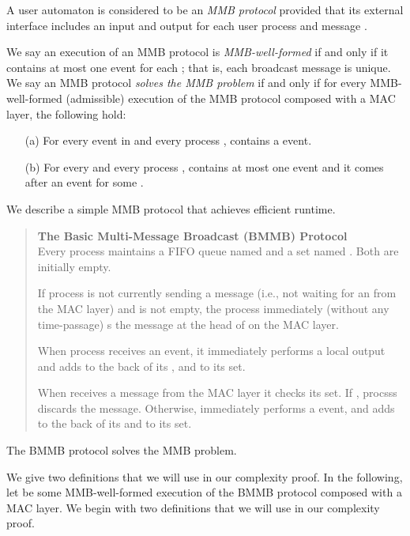A user automaton is considered to be an {\em MMB protocol} provided
that its external interface includes an  input
and  output for each user process 
and message .

We say an execution of an MMB protocol is {\em MMB-well-formed} if and only if it
contains at most one 
event for each ;
that is, each broadcast message is unique.
We say an MMB protocol {\em solves the MMB problem}
if and only if for every MMB-well-formed (admissible) execution 
of the MMB protocol composed with a MAC layer,
the following hold:
\begin{enumerate}
\item[(a)]
For every  event in  and every process ,
 contains a  event.
\item[(b)]
For every  and every process ,
 contains at most one  event and it
comes after an  event for some .
\end{enumerate}




We describe a simple MMB protocol that achieves efficient runtime.

\begin{quote}\small
{\bf The Basic Multi-Message Broadcast (BMMB) Protocol }\\
Every process  maintains a FIFO queue named  and a set
named .
Both are initially empty.

If process  is not currently sending a message (i.e., not waiting
for an  from the MAC layer) and  is not empty, the
process immediately (without any time-passage) s the message at
the head of  on the MAC layer.

When process  receives an  event, it immediately
performs a local  output and adds  to the back of its
, and to its  set.

When  receives a  message  from the MAC layer it checks
its  set.
If , procsss  discards the message.
Otherwise,  immediately performs a  event,
and adds  to the back of its  and to its  set.
\end{quote}


\begin{theorem}
The BMMB protocol solves the MMB problem.
\label{thm:bmmb}
\end{theorem}

We give two definitions that we will use in our complexity proof.
In the following, let  be some MMB-well-formed
execution of the BMMB protocol composed with a MAC layer.
We begin with two definitions that we will use in our complexity proof.

